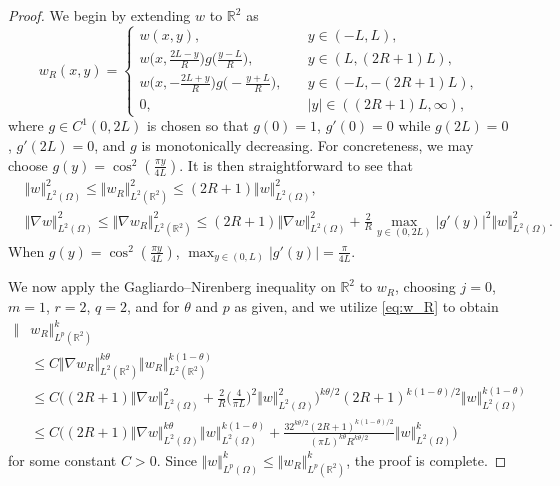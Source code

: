 \documentclass[10pt,a4paper]{amsart}
\newcommand{\LL}{L^2(\mathbb{R}^2)}
\newcommand{\LLO}{L^2(\Omega)}
\newcommand{\R}{\mathbb{R}}
\renewcommand{\leq}{\leqslant}
\newcommand{\lv}{\left\Vert}
\newcommand{\rv}{\right\Vert}
\begin{document}
\begin{proof}
We begin by extending $w$ to $\mathbb{R}^2$ as
\[
w_R(x,y) = \begin{cases}w(x,y),  &y \in (-L,L), \\
w\big(x,\frac{2L-y}{R}\big) g\big(\frac{y-L}{R}\big), &y \in (L,(2R+1)L), \\
w\big(x,-\frac{2L+y}{R}\big) g\big(-\frac{y+L}{R}\big), \quad &y \in (-L,-(2R+1)L), \\
0, &|y|\in((2R+1)L,\infty), \end{cases}
\]
where $g\in C^1(0,2L)$ is chosen so that $g(0)=1$, $g'(0)=0$ while $g(2L)=0$, $g'(2L)=0$, and $g$ is monotonically decreasing. For concreteness, we may choose $g(y) = \cos^2(\frac{\pi y}{4L})$. It is then straightforward to see that
\begin{equation}\label{eq:w_R}
\begin{aligned}
 &\Vert  w \Vert_{\LLO}^2 \leq \Vert w_R \Vert_{\LL}^2  \leq (2R+1) \Vert  w \Vert_{\LLO}^2,\\
 &\Vert \nabla  w \Vert_{\LLO}^2 \leq \Vert \nabla w_R \Vert_{\LL}^2 \leq (2R+1) \Vert \nabla  w\Vert^2_{\LLO} + \frac{2}{R} \max_{y\in(0,2L)}|g'(y)|^2 \Vert w \Vert_{\LLO}^2.
\end{aligned}
\end{equation}
When $g(y) = \cos^2(\frac{\pi y}{4L})$, $\max_{y\in(0,L)}|g'(y)|=\frac{\pi}{4L}$.

We now apply the Gagliardo--Nirenberg inequality on $\R^2$ to $w_R$, choosing $j = 0$, $m = 1$, $r = 2$, $q = 2$, and for $\theta$ and $p$ as given, and we utilize \eqref{eq:w_R} to obtain
\begin{align*}
\Vert & w_R \Vert_{L^p(\R^2)}^k \\
& \leq C \Vert \nabla w_R \Vert_{\LL}^{k\theta} \Vert w_R\Vert_{\LL}^{k(1-\theta)} \\
& \leq  C \Big((2R+1) \Vert \nabla  w\Vert^2_{\LLO} + \frac{2}{R} \Big(\frac{4}{\pi L}\Big)^2 \Vert w \Vert_{\LLO}^2 \Big)^{k\theta/2} (2R+1)^{k(1-\theta)/2} \Vert  w \Vert_{\LLO}^{k(1-\theta)}\\
&\leq C\Big((2R+1)\Vert \nabla  w \Vert_{\LLO}^{k\theta}\lv  w\rv_{\LLO}^{k(1-\theta)} + \frac{32^{k\theta/2}(2R+1)^{k(1-\theta)/2}}{(\pi L)^{k\theta}R^{k\theta/2}} \Vert  w \Vert_{\LLO}^k\Big)
\end{align*}
for some constant $C>0$. Since $\Vert w \Vert_{L^p(\Omega)}^k \leq \Vert w_R \Vert_{L^p(\R^2)}^k $, the proof is complete. 
\end{proof}
\end{document}
